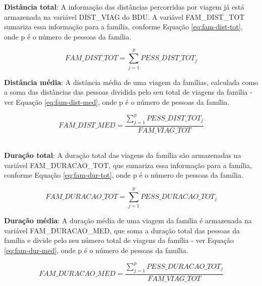 \begin{compactitem}
\newpage
\item \textbf{Distância total}:  A informação das distâncias percorridas por viagem já está armazenada na variável DIST_VIAG do BDU. A variável FAM_DIST_TOT sumariza essa informação para a família, conforme Equação \eqref{eq:fam-dist-tot}, onde p é o número de pessoas da família.

\begin{equation}\label{eq:fam-dist-tot}
FAM\_DIST\_TOT=\displaystyle\sum_{j=1}^{p}PESS\_DIST\_TOT_{j}
\end{equation}

\item \textbf{Distância média}: A distância média de uma viagem da famílias, calculada como a soma das distâncias das pessoas dividida pelo seu total de viagens da família - ver Equação \eqref{eq:fam-dist-med}, onde p é o número de pessoas da família.

\begin{equation}\label{eq:fam-dist-med}
FAM\_DIST\_MED=\frac{\displaystyle\sum_{j=1}^{p}PESS\_DIST\_TOT_{j}}{FAM\_VIAG\_TOT}
\end{equation}\\

\item \textbf{Duração total}: A duração total das viagens da família são armazenadas na variável FAM_DURACAO_TOT, que sumariza essa informação para a família, conforme Equação \eqref{eq:fam-dur-tot}, onde p é o número de pessoas da família.

\begin{equation}\label{eq:fam-dur-tot}
FAM\_DURACAO\_TOT=\displaystyle\sum_{j=1}^{p}PESS\_DURACAO\_TOT_{j}
\end{equation}

\item \textbf{Duração média}: A duração média de uma viagem da família é armazenada na variável FAM_DURACAO_MED, que soma a duração total das pessoas da família e divide pelo seu número total de viagens da família - ver Equação \eqref{eq:fam-dur-med}, onde p é o número de pessoas da família.

\begin{equation}\label{eq:fam-dur-med}
FAM\_DURACAO\_MED=\frac{\displaystyle\sum_{j=1}^{p}PESS\_DURACAO\_TOT_{j}}{FAM\_VIAG\_TOT}
\end{equation}\\


\end{compactitem}
